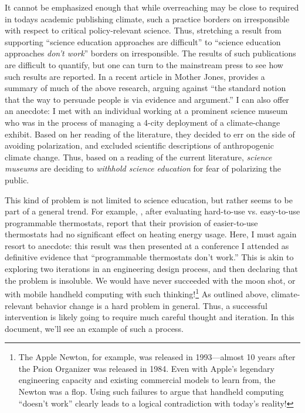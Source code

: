It cannot be emphasized enough that while overreaching may be close to required
in todays academic publishing climate, such a practice borders on irresponsible
with respect to critical policy-relevant science. Thus, stretching a result from
supporting “science education approaches are difficult” to “science education
approaches \emph{don't work}” borders on irresponsible. The results of such
publications are difficult to quantify, but one can turn to the mainstream press
to see how such results are reported. In a recent article in Mother Jones,
\textcite{mooney_science_2011} provides a summary of much of the above research,
arguing against “the standard notion that the way to persuade people is via
evidence and argument.” I can also offer an anecdote: I met with an individual
working at a prominent science museum who was in the process of managing a
4-city deployment of a climate-change exhibit.  Based on her reading of the
literature, they decided to err on the side of avoiding polarization, and
excluded scientific descriptions of anthropogenic climate change. Thus, based on
a reading of the current literature, \emph{science museums} are deciding to
\emph{withhold science education} for fear of polarizing the public.

This kind of problem is not limited to science education, but rather seems to be
part of a general trend. For example, \textcite{sachs_field_2012}, after evaluating
hard-to-use vs. easy-to-use programmable thermostats, report that their
provision of easier-to-use thermostats had no significant effect on heating
energy usage. Here, I must again resort to anecdote: this result was then
presented at a conference I attended as definitive evidence that “programmable
thermostats don't work.” 
This is akin to exploring two iterations in an
engineering design process, and then declaring that the problem is insoluble. We
would have never succeeded with the moon shot, or with mobile handheld computing
with such thinking!\footnote{The Apple Newton, for example, was released in
    1993---almost 10 years after the Psion Organizer was released in 1984. Even
    with Apple's legendary engineering capacity and existing commercial models
    to learn from, the Newton was a flop. Using such failures to argue that
    handheld computing “doesn't work” clearly leads to a logical contradiction
    with today's reality!}
As outlined above, climate-relevant behavior change is a hard problem in
general.  Thus, a successful intervention is likely going to require much
careful thought and iteration. In this document, we'll see an example of such a
process.

